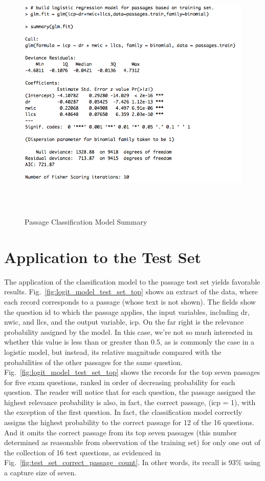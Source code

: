 \begin{figure}
\centering
\vspace{1.0in}
\includegraphics[width=125mm, height=125mm]{logit_model_summary.png}
\caption{Passage Classification Model Summary}
\label{fig:logit_model_summary}
\end{figure}


\section{Application to the Test Set}

The application of the classification model to the passage test set yields favorable results.  Fig.~\ref{fig:logit_model_test_set_top} shows an extract of the data, where each record corresponds to a passage (whose text is not shown).  The fields show the question id to which the passage applies, the input variables, including dr, nwic, and llcs, and the output variable, icp.  On the far right is the relevance probability assigned by the model.  In this case, we're not so much interested in whether this value is less than or greater than 0.5, as is commonly the case in a logistic model, but instead, its relative magnitude compared with the probabilities of the other passages for the same question.  Fig.~\ref{fig:logit_model_test_set_top} shows the records for the top seven passages for five exam questions, ranked in order of decreasing probability for each question.  The reader will notice that for each question, the passage assigned the highest relevance probability is also, in fact, the correct passage, (icp = 1), with the exception of the first question.  In fact, the classification model correctly assigns the highest probability to the correct passage for 12 of the 16 questions.  And it omits the correct passage from its top seven passages (this number determined as reasonable from observation of the training set) for only one out of the collection of 16 test questions, as evidenced in Fig.~\ref{fig:test_set_correct_passage_count}.  In other words, its recall is 93\% using a capture size of seven.



